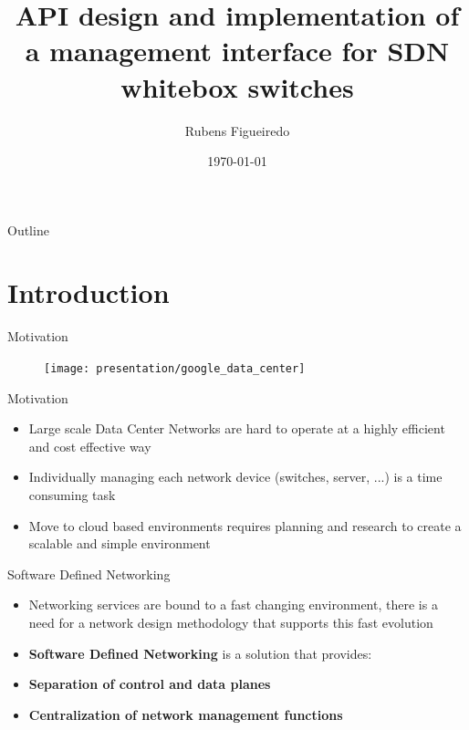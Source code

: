 \documentclass{beamer}
\title[Management Interface]{API design and implementation of a management interface for SDN whitebox switches }
\author{Rubens Figueiredo}
\institute{FEUP}
\date{\today}
\begin{document}
\begin{frame}
  \titlepage
        \texttt{[image: \{uporto-feup]}}
        \texttt{[image: \{bisdn-logo]}}
\end{frame}

\begin{frame}{Outline}
  \tableofcontents
\end{frame}

\section{Introduction}

\begin{frame}{Motivation}
    \begin{figure}
        \centering
        \texttt{[image: presentation/google\_data\_center]}
    \end{figure}
\end{frame}

\begin{frame}{Motivation}
	\begin{itemize}
  		\item Large scale Data Center Networks are hard to operate at a highly efficient and cost effective way
        \item Individually managing each network device (switches, server, ...) is a time consuming task
  		\item Move to cloud based environments requires planning and research to create a scalable and simple environment
	\end{itemize}
\end{frame}

\begin{frame}{Software Defined Networking}
    \begin{itemize}
    \item Networking services are bound to a fast changing environment, there is a need for a network design methodology that supports this
        fast evolution
        \pause
    \item \textbf{Software Defined Networking} is a solution that provides:
        \pause
    \item \textbf{Separation of control and data planes} 
        \pause
    \item \textbf{Centralization of network management functions}
    \end{itemize}
\end{frame}
\end{document}
